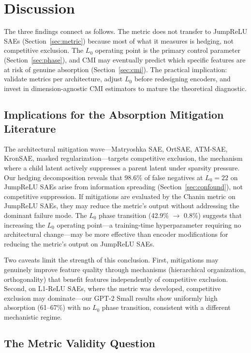 \documentclass{article}
\begin{document}
\section{Discussion}
\label{sec:discussion}

The three findings connect as follows. The metric does not transfer to JumpReLU SAEs (Section~\ref{sec:metric}) because most of what it measures is hedging, not competitive exclusion. The $L_0$ operating point is the primary control parameter (Section~\ref{sec:phase}), and CMI may eventually predict which specific features are at risk of genuine absorption (Section~\ref{sec:cmi}). The practical implication: validate metrics per architecture, adjust $L_0$ before redesigning encoders, and invest in dimension-agnostic CMI estimators to mature the theoretical diagnostic.

\subsection{Implications for the Absorption Mitigation Literature}

The architectural mitigation wave---Matryoshka SAE, OrtSAE, ATM-SAE, KronSAE, masked regularization---targets competitive exclusion, the mechanism where a child latent actively suppresses a parent latent under sparsity pressure. Our hedging decomposition reveals that 98.6\% of false negatives at $L_0{=}22$ on JumpReLU SAEs arise from information spreading (Section~\ref{sec:confound}), not competitive suppression. If mitigations are evaluated by the Chanin metric on JumpReLU SAEs, they may reduce the metric's output without addressing the dominant failure mode. The $L_0$ phase transition (42.9\% $\to$ 0.8\%) suggests that increasing the $L_0$ operating point---a training-time hyperparameter requiring no architectural change---may be more effective than encoder modifications for reducing the metric's output on JumpReLU SAEs.

Two caveats limit the strength of this conclusion. First, mitigations may genuinely improve feature quality through mechanisms (hierarchical organization, orthogonality) that benefit features independently of competitive exclusion. Second, on L1-ReLU SAEs, where the metric was developed, competitive exclusion may dominate---our GPT-2 Small results show uniformly high absorption (61--67\%) with no $L_0$ phase transition, consistent with a different mechanistic regime.

\subsection{The Metric Validity Question}
\end{document}
